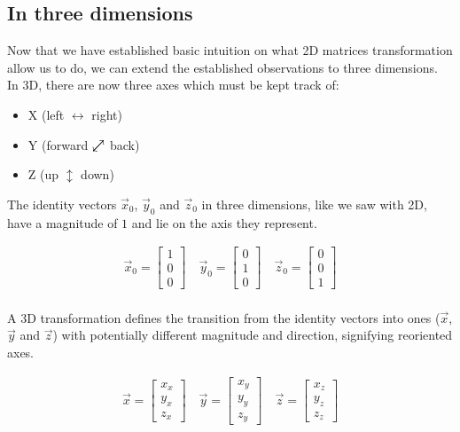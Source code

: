 \documentclass[12pt, a4paper]{article}
\newcommand{\neswarrow}{\ensurestackMath{\stackengine{0pt}{\nearrow}{\swarrow}{O}{c}{F}{F}{L}}}
\begin{document}
\subsection{In three dimensions}
Now that we have established basic intuition on what 2D matrices transformation
allow us to do, we can extend the established observations to three dimensions.
\\

In 3D, there are now three axes which must be kept track of:
\begin{itemize}[leftmargin=2cm]
    \item X (left $\leftrightarrow$ right)
    \item Y (forward $\neswarrow$ back)
    \item Z (up $\updownarrow$ down)
\end{itemize}

The identity vectors $\vec{x}_0$, $\vec{y}_0$ and $\vec{z}_0$ in three
dimensions, like we saw with 2D, have a magnitude of $1$ and lie on the axis
they represent.

\begin{align*}
    \vec{x}_0 = \begin{bmatrix} 1 \\ 0 \\ 0 \end{bmatrix}
    \quad
    \vec{y}_0 = \begin{bmatrix} 0 \\ 1 \\ 0 \end{bmatrix}
    \quad
    \vec{z}_0 = \begin{bmatrix} 0 \\ 0 \\ 1 \end{bmatrix}
\end{align*} \\

A 3D transformation defines the transition from the identity vectors into ones
($\vec{x}$, $\vec{y}$ and $\vec{z}$) with potentially different magnitude and
direction, signifying reoriented axes.

\begin{align*}
    \vec{x} = \begin{bmatrix}
                  {x}_x \\ {y}_x \\ {z}_x
              \end{bmatrix}
    \quad
    \vec{y} = \begin{bmatrix}
                  {x}_y \\ {y}_y \\ {z}_y
              \end{bmatrix}
    \quad
    \vec{z} = \begin{bmatrix}
                  {x}_z \\ {y}_z \\ {z}_z
              \end{bmatrix}
\end{align*}
\end{document}
